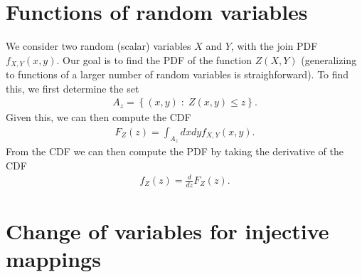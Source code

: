 \section{Functions of random variables}

We consider two random (scalar) variables $X$ and $Y$, with the join PDF $f_{X,Y}\left(x,y\right)$.
Our goal is to find the PDF of the function $Z\left(X,Y\right)$ (generalizing to functions of a larger number of random variables is straighforward).
To find this, we first determine the set
\begin{align}
    A_{z}
    =
    \left\{\left(x,y\right) \; : \; Z\left(x,y\right) \leq z\right\}
    .
\end{align}
Given this, we can then compute the CDF
\begin{align}
    F_Z\left(z\right)
    =
    \int_{A_z} dx dy f_{X,Y}\left(x,y\right)
    .
\end{align}
From the CDF we can then compute the PDF by taking the derivative of the CDF
\begin{align}
    f_Z\left(z\right) = \frac{d}{dz}F_Z\left(z\right)
    .
\end{align}
\section{Change of variables for injective mappings}


